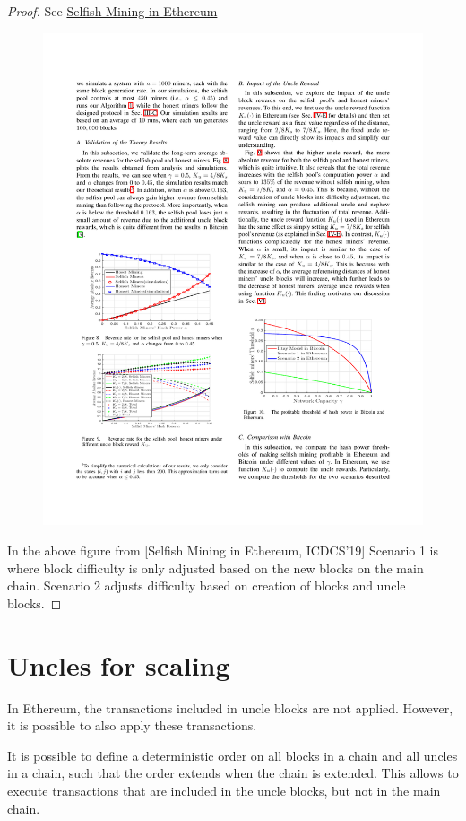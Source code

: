 \begin{proof} See \href{https://arxiv.org/pdf/1901.04620.pdf}{Selfish Mining in Ethereum} 
	\begin{figure}[H]
		\centering
		\includegraphics{fig/inclusive-selfish-mining}
	\end{figure}
	In the above figure from [Selfish Mining in Ethereum, ICDCS'19] Scenario 1 is where block difficulty is only adjusted based on the new blocks on the main chain.
	Scenario 2 adjusts difficulty based on creation of blocks and uncle blocks.
	
\end{proof}

\section{Uncles for scaling}
In Ethereum, the transactions included in uncle blocks are not applied. However, it is possible to also apply these transactions.

\begin{theorem}
	\label{thm:uncleorder}
It is possible to define a deterministic order on all blocks in a chain and all uncles in a chain, such that the order extends when the chain is extended.
This allows to execute transactions that are included in the uncle blocks, but not in the main chain.
\end{theorem}

